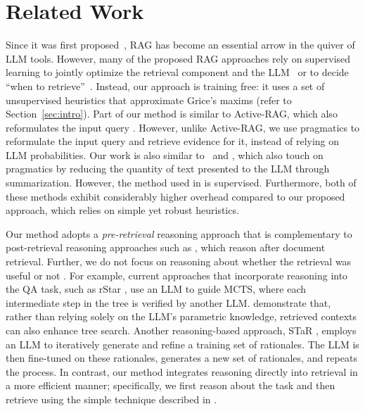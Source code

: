 \section{Related Work}
\label{sec:related-work}
Since it was first proposed~\cite{lewis2020retrieval}, RAG has become an essential arrow in the quiver of LLM tools. However, many of the proposed RAG approaches rely on supervised learning to jointly optimize the retrieval component and the LLM~\citep[inter alia]{lewis2020retrieval,guu2020realmretrievalaugmentedlanguagemodel,xu2024recomp,kim2024reragimprovingopendomainqa} or to decide ``when to retrieve''~\cite{asai2024selfrag}. Instead, our approach is training free: it uses a set of unsupervised heuristics that approximate Grice's maxims (refer to Section~\ref{sec:intro}). 
Part of our method is similar to Active-RAG, which also reformulates the input query \cite{jiang2023activeretrievalaugmentedgeneration}. However, unlike Active-RAG, we use pragmatics to reformulate the input query and retrieve evidence for it,  instead of relying on LLM probabilities.
Our work is also similar to~\cite{xu2024recomp} and \cite{sarthi2024raptor}, which also touch on pragmatics by reducing the quantity of text presented to the LLM through summarization. However, the method used in \cite{xu2024recomp} is supervised. Furthermore, both of these methods exhibit considerably higher overhead compared to our proposed approach, which relies on simple yet robust heuristics. 

Our method adopts a {\em pre-retrieval} reasoning approach that is complementary to post-retrieval reasoning approaches such as \cite{trivedi2023interleavingretrievalchainofthoughtreasoning,kim2023treeclarificationsansweringambiguous},
which reason after document retrieval.
Further, we do not focus on reasoning about whether the retrieval was useful or not \cite{islam2024openrag}.
For example, current approaches that incorporate reasoning into the QA task, such as rStar \cite{qi2024mutualreasoningmakessmaller}, use an LLM to guide MCTS, where each intermediate step in the tree is verified by another LLM. \cite{jiang2024ragstarenhancingdeliberativereasoning} demonstrate that, rather than relying solely on the LLM’s parametric knowledge, retrieved contexts can also enhance tree search.
Another reasoning-based approach, STaR \cite{zelikman2022starbootstrappingreasoningreasoning}, employs an LLM to iteratively generate and refine a training set of rationales. The LLM is then fine-tuned on these rationales, generates a new set of rationales, and repeats the process.
In contrast, our method integrates reasoning directly into retrieval in a more efficient manner; specifically, we first reason about the task and then retrieve using the simple technique described in \cite{zheng2024stepbackevokingreasoning}.

